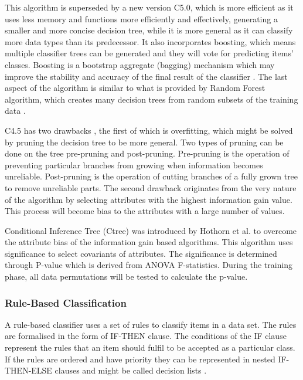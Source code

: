 This algorithm is superseded by a new version C5.0, which is more efficient as it uses less memory and functions more efficiently and effectively, generating a smaller and more concise decision tree, while it is more general as it can classify more data types than its predecessor. It also incorporates boosting, which means multiple classifier trees can be generated and they will vote for predicting items' classes. Boosting is a bootstrap aggregate (bagging) mechanism which may improve the stability and accuracy of the final result of the classifier \cite{Wu2008}. The last aspect of the algorithm is similar to what is provided by Random Forest algorithm, which creates many decision trees from random subsets of the training data \cite{Breiman2001}.

C4.5 has two drawbacks \cite{Hothorn2006}, the first of which is overfitting, which might be solved by pruning the decision tree to be more general. Two types of pruning can be done on the tree pre-pruning and post-pruning. Pre-pruning is the operation of preventing particular branches from growing when information becomes unreliable. Post-pruning is the operation of cutting branches of a fully grown tree to remove unreliable parts. The second drawback originates from the very nature of the algorithm by selecting attributes with the highest information gain value. This process will become bias to the attributes with a large number of values.

Conditional Inference Tree (Ctree) was introduced by Hothorn et al. \cite{Hothorn2006} to overcome the attribute bias of the information gain based algorithms. This algorithm uses significance to select covariants of attributes. The significance is determined through P-value which is derived from ANOVA F-statistics. During the training phase, all data permutations will be tested to calculate the p-value.

\subsubsection{Rule-Based Classification}

A rule-based classifier uses a set of rules to classify items in a data set. The rules are formalised in the form of IF-THEN clause. The conditions of the IF clause represent the rules that an item should fulfil to be accepted as a particular class. If the rules are ordered and have priority they can be represented in nested IF-THEN-ELSE clauses and might be called decision lists \cite{Witten2011}. 

